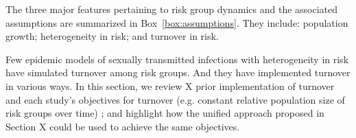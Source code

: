 The three major features pertaining to risk group dynamics and the associated assumptions			%
are summarized in Box~\ref{box:assumptions}. They include: population growth; heterogeneity in risk; and turnover in risk.

Few epidemic models of sexually transmitted infections with 
heterogeneity in risk 
have simulated turnover among risk groups.												%
And they have implemented turnover in various ways. In this section, we review
X prior implementation of turnover and each study's objectives for turnover (e.g. constant relative population size of risk groups over time)
; and highlight how the unified approach
proposed in Section X could be used to achieve the same objectives.			%
																	
